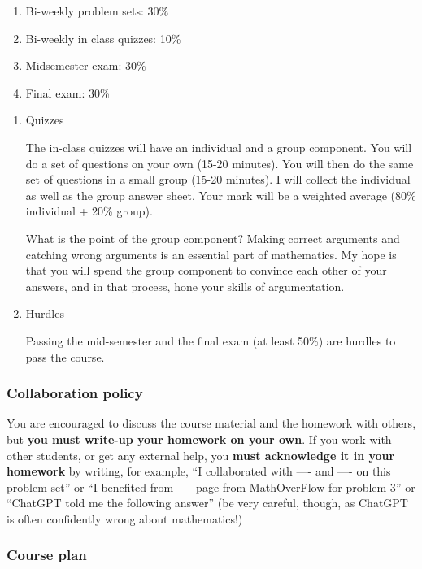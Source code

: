\documentclass[11pt]{article}
\begin{document}
\begin{enumerate}
\item Bi-weekly problem sets: 30\%
\item Bi-weekly in class quizzes: 10\%
\item Midsemester exam: 30\%
\item Final exam: 30\%
\end{enumerate}
\begin{enumerate}
\item Quizzes
\label{sec:org8e0c680}

The in-class quizzes will have an individual and a group component.
You will do a set of questions on your own (15-20 minutes).
You will then do the same set of questions in a small group (15-20 minutes).
I will collect the individual as well as the group answer sheet.
Your mark will be a weighted average (80\% individual + 20\% group).

What is the point of the group component?
Making correct arguments and catching wrong arguments is an essential part of mathematics.
My hope is that you will spend the group component to convince each other of your answers, and in that process, hone your skills of argumentation. 
\item Hurdles
\label{sec:org70f2d17}

Passing the mid-semester and the final exam (at least 50\%) are hurdles to pass the course.
\end{enumerate}
\subsubsection{Collaboration policy}
\label{sec:org960a914}

You are encouraged to discuss the course material and the homework with others, but \textbf{you must write-up your homework on your own}.  If you work with other students, or get any external help, you \textbf{must acknowledge it in your homework} by writing, for example, ``I collaborated with ---- and ---- on this problem set'' or ``I benefited from ---- page from MathOverFlow for problem 3'' or ``ChatGPT told me the following answer''  (be very careful, though, as ChatGPT is often confidently wrong about mathematics!)
\subsubsection{Course plan}
\label{sec:orgeb4f29e}
\end{document}
